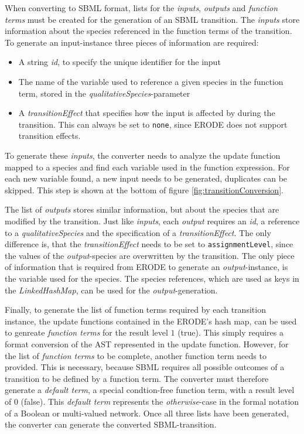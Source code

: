When converting to SBML format, lists for the \emph{inputs}, \emph{outputs} and \emph{function terms} must be created for the generation of an SBML transition. The \emph{inputs} store information about the species referenced in the function terms of the transition. To generate an input-instance three pieces of information are required:
\begin{itemize}
    \item A string \emph{id}, to specify the unique identifier for the input
    \item The name of the variable used to reference a given species in the function term, stored in the \emph{qualitativeSpecies}-parameter
    \item A \emph{transitionEffect} that specifies how the input is affected by during the transition. This can always be set to \texttt{none}, since ERODE does not support transition effects.
\end{itemize}
To generate these \emph{inputs}, the converter needs to analyze the update function mapped to a species and find each variable used in the function expression. For each new variable found, a new input needs to be generated, duplicates can be skipped. This step is shown at the bottom of figure \ref{fig:transitionConversion}.

The list of \emph{outputs} stores similar information, but about the species that are modified by the transition. Just like \emph{inputs}, each \emph{output} requires an \emph{id}, a reference to a \emph{qualitativeSpecies} and the specification of a \emph{transitionEffect}. The only difference is, that the \emph{transitionEffect} needs to be set to \texttt{assignmentLevel}, since the values of the \emph{output}-species are overwritten by the transition. The only piece of information that is required from ERODE to generate an \emph{output}-instance, is the variable used for the species. The species references, which are used as keys in the \emph{LinkedHashMap}, can be used for the \emph{output}-generation.

Finally, to generate the list of function terms required by each transition instance, the update functions contained in the ERODE's hash map, can be used to genreate \emph{function terms} for the result level $1$ (true). This simply requires a format conversion of the AST represented in the update function. However, for the list of \emph{function terms} to be complete, another function term needs to provided. This is necessary, because SBML requires all possible outcomes of a transition to be defined by a function term. The converter must therefore generate a \emph{default term}, a special condtion-free function term, with a result level of $0$ (false). This \emph{default term} represents the \emph{otherwise}-case in the formal notation of a Boolean or multi-valued network.
Once all three lists have been generated, the converter can generate the converted SBML-transition.

